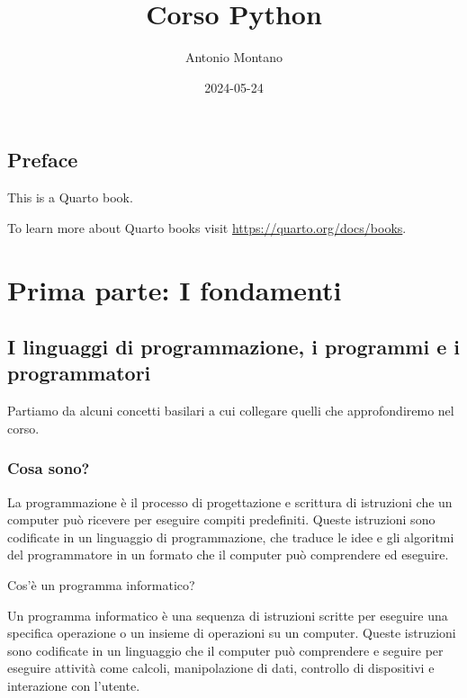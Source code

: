 \documentclass[
  letterpaper,
  DIV=11,
  numbers=noendperiod]{scrreprt}
\title{Corso Python}
\author{Antonio Montano}
\date{2024-05-24}
\renewcommand*\contentsname{Table of contents}
\newcommand\contentsname{Table of contents}
\begin{document}
\maketitle

\renewcommand*\contentsname{Table of contents}
{
\hypersetup{linkcolor=}
\setcounter{tocdepth}{2}
\tableofcontents
}

\chapter*{Preface}\label{preface}


This is a Quarto book.

To learn more about Quarto books visit
\url{https://quarto.org/docs/books}.

\part{Prima parte: I fondamenti}

\chapter{I linguaggi di programmazione, i programmi e i
programmatori}\label{i-linguaggi-di-programmazione-i-programmi-e-i-programmatori}

Partiamo da alcuni concetti basilari a cui collegare quelli che
approfondiremo nel corso.

\section{Cosa sono?}\label{cosa-sono}

La programmazione è il processo di progettazione e scrittura di
istruzioni che un computer può ricevere per eseguire compiti
predefiniti. Queste istruzioni sono codificate in un linguaggio di
programmazione, che traduce le idee e gli algoritmi del programmatore in
un formato che il computer può comprendere ed eseguire.

Cos'è un programma informatico?

Un programma informatico è una sequenza di istruzioni scritte per
eseguire una specifica operazione o un insieme di operazioni su un
computer. Queste istruzioni sono codificate in un linguaggio che il
computer può comprendere e seguire per eseguire attività come calcoli,
manipolazione di dati, controllo di dispositivi e interazione con
l'utente.
\end{document}
